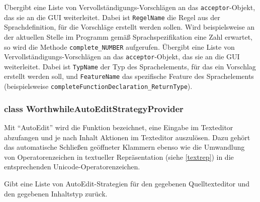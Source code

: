 \begin{description}
	 Übergibt eine Liste von Vervollständigungs-Vorschlägen an das \texttt{acceptor}-Objekt, das sie an die GUI weiterleitet. Dabei ist \texttt{RegelName} die Regel aus der Sprachdefinition, für die Vorschläge erstellt werden sollen. Wird beispielsweise an der aktuellen Stelle im Programm gemäß Sprachspezifikation eine Zahl erwartet, so wird die Methode \texttt{complete\_{}NUMBER} aufgerufen.
	Übergibt eine Liste von Vervollständigungs-Vorschlägen an das \texttt{acceptor}-Objekt, das sie an die GUI weiterleitet. Dabei ist \texttt{TypName} der Typ des Sprachelements, für das ein Vorschlag erstellt werden soll, und \texttt{FeatureName} das spezifische Feature des Sprachelements (beispielsweise \texttt{completeFunctionDeclaration\_{}ReturnType}).
\end{description}

\subsubsection{class WorthwhileAutoEditStrategyProvider}

Mit "`AutoEdit"' wird die Funktion bezeichnet, eine Eingabe im Texteditor abzufangen und je nach Inhalt Aktionen im Texteditor auszulösen. Dazu gehört das automatische Schließen geöffneter Klammern ebenso wie die Umwandlung von Operatorenzeichen in textueller Repräsentation (siehe \ref{textrep}) in die entsprechenden Unicode-Operatorenzeichen.

\begin{description}
	Gibt eine Liste von AutoEdit-Strategien für den gegebenen Quelltexteditor und den gegebenen Inhaltstyp zurück.
\end{description}
